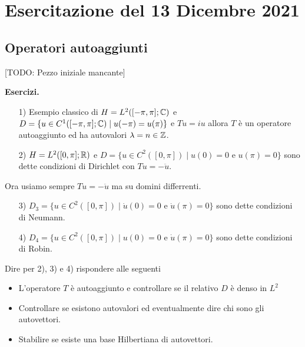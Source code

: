 
\section{Esercitazione del 13 Dicembre 2021}

\subsection{Operatori autoaggiunti}

[TODO: Pezzo iniziale mancante]

\textbf{Esercizi.}
\begin{enumerate}
	\item[1)] Esempio classico di $H = L^2([-\pi, \pi]; \mathbb C)$ e $D = \{ u \in C^1([-\pi, \pi]; \mathbb C) \mid u(-\pi) = u(\pi) \}$ e $T u = i u$ allora $T$ è un operatore autoaggiunto ed ha autovalori $\lambda = n \in \mathbb Z$.
	
	\item[2)] $H = L^2([0, \pi]; \mathbb R)$ e $D = \{ u \in C^2([0, \pi]) \mid u(0) = 0 \text{ e } u(\pi) = 0 \}$ sono dette condizioni di Dirichlet con $T u = - \ddot u$.
\end{enumerate}

Ora usiamo sempre $T u = -\ddot u$ ma su domini differrenti.

\begin{enumerate}
	\item[3)] $D_3 = \{ u \in C^2([0, \pi]) \mid \dot u(0) = 0 \text{ e } \dot u(\pi) = 0 \}$ sono dette condizioni di Neumann.
	
	\item[4)] $D_4 = \{ u \in C^2([0, \pi]) \mid u(0) = 0 \text{ e } \dot u(\pi) = 0 \}$ sono dette condizioni di Robin.
\end{enumerate}
Dire per 2), 3) e 4) rispondere alle seguenti
\begin{itemize}
	\item L'operatore $T$ è autoaggiunto e controllare se il relativo $D$ è denso in $L^2$
	\item Controllare se esistono autovalori ed eventualmente dire chi sono gli autovettori.
	\item Stabilire se esiste una base Hilbertiana di autovettori.
\end{itemize}

